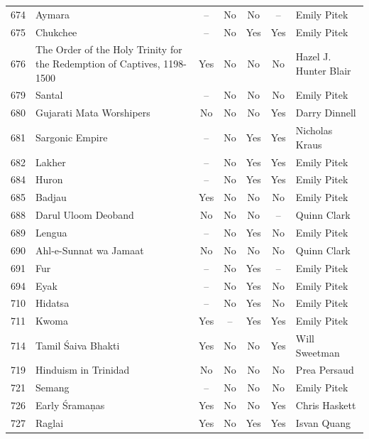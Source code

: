 {\begin{longtable}{rp{3.5cm}ccccp{3cm}}
674 & {\raggedright Aymara} & -- & No & No & -- & {\raggedright Emily Pitek} \\
675 & {\raggedright Chukchee} & -- & No & Yes & Yes & {\raggedright Emily Pitek} \\
676 & {\raggedright The Order of the Holy Trinity for the Redemption of Captives, 1198-1500} & Yes & No & No & No & {\raggedright Hazel J. Hunter Blair} \\
679 & {\raggedright Santal} & -- & No & No & No & {\raggedright Emily Pitek} \\
680 & {\raggedright Gujarati Mata Worshipers} & No & No & No & Yes & {\raggedright Darry Dinnell} \\
681 & {\raggedright Sargonic Empire} & -- & No & Yes & Yes & {\raggedright Nicholas Kraus} \\
682 & {\raggedright Lakher} & -- & No & Yes & Yes & {\raggedright Emily Pitek} \\
684 & {\raggedright Huron} & -- & No & Yes & Yes & {\raggedright Emily Pitek} \\
685 & {\raggedright Badjau} & Yes & No & No & No & {\raggedright Emily Pitek} \\
688 & {\raggedright Darul Uloom Deoband} & No & No & No & -- & {\raggedright Quinn Clark} \\
689 & {\raggedright Lengua} & -- & No & Yes & No & {\raggedright Emily Pitek} \\
690 & {\raggedright Ahl-e-Sunnat wa Jamaat} & No & No & No & No & {\raggedright Quinn Clark} \\
691 & {\raggedright Fur} & -- & No & Yes & -- & {\raggedright Emily Pitek} \\
694 & {\raggedright Eyak} & -- & No & Yes & No & {\raggedright Emily Pitek} \\
710 & {\raggedright Hidatsa} & -- & No & Yes & No & {\raggedright Emily Pitek} \\
711 & {\raggedright Kwoma} & Yes & -- & Yes & Yes & {\raggedright Emily Pitek} \\
714 & {\raggedright Tamil Śaiva Bhakti} & Yes & No & No & Yes & {\raggedright Will Sweetman} \\
719 & {\raggedright Hinduism in Trinidad} & No & No & No & No & {\raggedright Prea Persaud} \\
721 & {\raggedright Semang} & -- & No & No & No & {\raggedright Emily Pitek} \\
726 & {\raggedright Early Śramaṇas} & Yes & No & No & Yes & {\raggedright Chris Haskett} \\
727 & {\raggedright Raglai} & Yes & No & Yes & Yes & {\raggedright Isvan Quang} \\

\end{longtable}}
